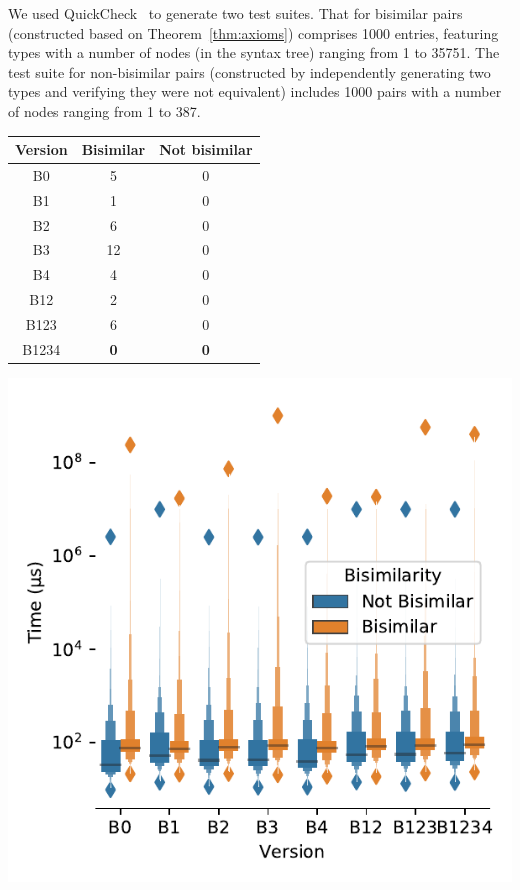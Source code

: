 We used QuickCheck~\cite{DBLP:conf/icfp/ClaessenH00} to generate two test
suites. That for bisimilar pairs (constructed based on
Theorem~\ref{thm:axioms}) comprises 1000 entries, featuring types with
a number of nodes (in the syntax tree) ranging from 1 to 35751. The
test suite for non-bisimilar pairs (constructed by independently
generating two types and verifying they were not equivalent) includes
1000 pairs with a number of nodes ranging from 1 to 387.\\
%
%
  \begin{minipage}[b]{0.49\textwidth}
   {\small 
  \centering
 
	\begin{tabular}{ |c|c|c| }
	 \hline
 		Version &  {\color{MidnightBlue}Bisimilar} & {\color{orange}Not bisimilar}  \\ 
 		 \hline
	 	B0 & 5 & 0 \\  
	 	B1 &  1 & 0 \\ 
	 	B2 & 6 & 0 \\ 
	 	B3 &  12 & 0 \\
	 	B4 &  4 & 0 \\
	 	B12 &  2 & 0 \\   
	 	B123 &  6 & 0 \\
	 	B1234 &  \bf{0} & \bf{0} \\ 
	 	 \hline  
	\end{tabular}\vspace*{6mm}
	}
	\end{minipage}
	\hfill
\begin{minipage}[b]{0.49\textwidth}
 {\small 
\centering
    \includegraphics[height=.85\textwidth]{img/distribution_boxplot}%
    }
\end{minipage}
